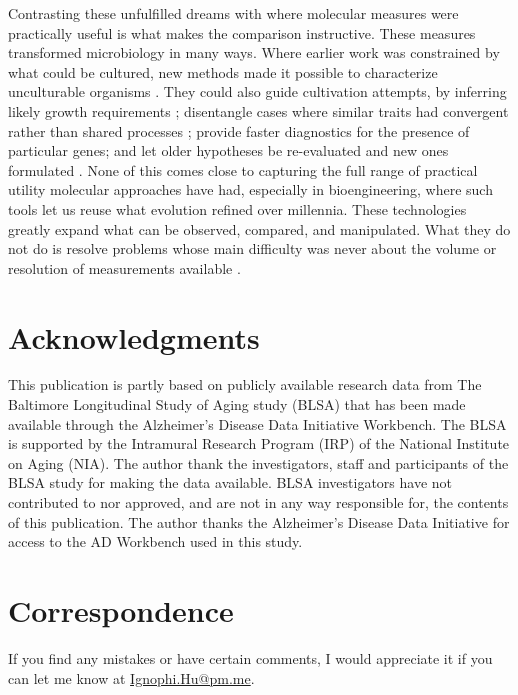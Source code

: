 \documentclass[twocolumn]{article} %
\begin{document}
Contrasting these unfulfilled dreams with where molecular measures were practically useful is what makes the comparison instructive. These measures transformed microbiology in many ways. Where earlier work was constrained by what could be cultured, new methods made it possible to characterize unculturable organisms \citep[b]{hugenholtz1996identifying}. They could also guide cultivation attempts, by inferring likely growth requirements \citep[c]{hugenholtz1996identifying}; disentangle cases where similar traits had convergent rather than shared processes \citep[d]{manhart1992molecular}; provide faster diagnostics for the presence of particular genes; and let older hypotheses be re-evaluated and new ones formulated \citep[d]{claridge1997species}\citep[a]{mcelreath2016statistical}. None of this comes close to capturing the full range of practical utility molecular approaches have had, especially in bioengineering, where such tools let us reuse what evolution refined over millennia. These technologies greatly expand what can be observed, compared, and manipulated. What they do not do is resolve problems whose main difficulty was never about the volume or resolution of measurements available \citep[c]{manhart1992molecular}.

\section*{Acknowledgments}

This publication is partly based on publicly available research data from The Baltimore Longitudinal Study of Aging study (BLSA) that has been made available through the Alzheimer’s Disease Data Initiative Workbench. The BLSA is supported by the Intramural Research Program (IRP) of the National Institute on Aging (NIA). The author thank the investigators, staff and participants of the BLSA study for making the data available. BLSA investigators have not contributed to nor approved, and are not in any way responsible for, the contents of this publication. The author thanks the Alzheimer’s Disease Data Initiative for access to the AD Workbench used in this study.

\section*{Correspondence}
If you find any mistakes or have certain comments, I would appreciate it if you can let me know at \href{mailto:Ignophi.Hu@pm.me}{Ignophi.Hu@pm.me}.
\end{document}
